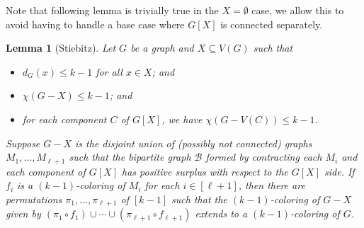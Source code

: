 \documentclass[12pt]{article}
\theoremstyle{plain}
\newtheorem{lem}[thm]{Lemma}
\theoremstyle{definition}
\theoremstyle{remark}
\newcommand{\fancy}[1]{\mathcal{#1}}
\newcommand{\B}{\fancy{B}}
\newcommand{\irange}[1]{\left[#1\right]}
\begin{document}
Note that following lemma is trivially true in the $X = \emptyset$ case, we allow this to avoid having to handle a base case where $G[X]$ is connected separately.
\begin{lem}[Stiebitz]
Let $G$ be a graph and $X \subseteq V(G)$ such that
\begin{itemize}
\item $d_G(x) \le k - 1$ for all $x \in X$; and
\item $\chi(G-X) \le k-1$; and
\item for each component $C$ of $G[X]$, we have $\chi(G - V(C)) \le k - 1$.
\end{itemize}
Suppose $G-X$ is the disjoint union of (possibly not connected) graphs $M_1, \ldots, M_{\ell + 1}$ such that the bipartite graph $\B$ formed by contracting each $M_i$ and each component of $G[X]$ has positive surplus with respect to the $G[X]$ side.  If $f_i$ is a $(k-1)$-coloring of $M_i$ for each $i \in \irange{\ell + 1}$, then there are permutations $\pi_1, \ldots, \pi_{\ell + 1}$ of $\irange{k-1}$ such that the $(k-1)$-coloring of $G-X$ given by $(\pi_1 \circ f_1) \cup \cdots \cup (\pi_{\ell + 1} \circ f_{\ell + 1})$ extends to a $(k - 1)$-coloring of $G$.
\label{WithPositiveSurplus}
\end{lem}
\end{document}

